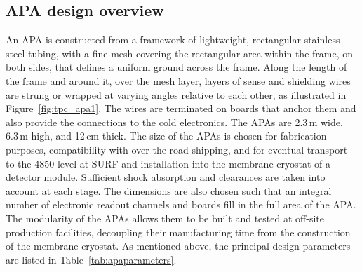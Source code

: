 \subsection{APA design overview}
\label{sec:apa-design-overview}

An APA is constructed from a framework of lightweight, rectangular stainless steel tubing, with a fine mesh covering the rectangular area within the frame, on both sides, that defines a uniform ground across the frame. Along the length of the frame and around it, over the mesh layer, layers of sense and shielding wires are strung or wrapped at varying angles relative to each other, as illustrated in  Figure~\ref{fig:tpc_apa1}. The wires are terminated on  boards that anchor them and also provide the connections to the cold electronics. The APAs are 2.3\,m wide, 6.3\,m high, and 12\,cm thick.  
The size of the APAs is chosen for fabrication purposes, compatibility with over-the-road shipping, and for eventual transport to the 4850 level at SURF and installation into the membrane cryostat of a detector module. Sufficient shock absorption and clearances are taken into account at each stage.  The dimensions are also chosen such that an integral number of electronic readout channels and boards fill in the full area of the APA. The modularity of the APAs allows them to be built and tested at off-site production facilities, decoupling their manufacturing time from the construction of the membrane cryostat. 
As mentioned above, the principal design parameters are listed in Table~\ref{tab:apaparameters}.

